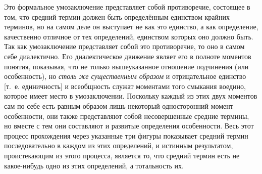 Это формальное умозаключение представляет собой противоречие,
состоящее в том, что средний термин должен быть определённым
единством крайних терминов, но на самом деле он выступает не
как это единство, а как определение, качественно отличное от тех
определений, единством которых оно должно быть. Так как умозаключение
представляет собой это противоречие, то оно в самом себе диалектично. Его
диалектическое движение являет его в полноте моментов понятия, показывая,
что не только вышеуказанное отношение подчинения (или особенность), но
{\em столь же существенным образом}
и отрицательное единство [т.~е. единичность] и всеобщность
служат моментами того смыкания воедино, которое имеет место в
умозаключении. Поскольку каждый из этих двух моментов сам по себе есть
равным образом лишь некоторый односторонний момент особенности, они также
представляют собой несовершенные средние термины, но вместе с тем они
составляют и развитые определения особенности. Весь этот процесс
прохождения через указанные три фигуры показывает средний термин
последовательно в каждом из этих определений, и истинным результатом,
проистекающим из этого процесса, является то, что средний термин есть не
какое-нибудь одно из этих определений, а тотальность их.

